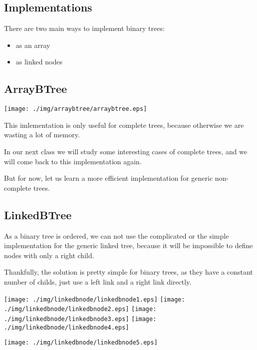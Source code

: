 \documentclass[a4paper, 9pt]{extarticle}
\begin{document}
\newpage



\subsection{Implementations}

There are two main ways to implement binary trees:

\begin{itemize}

  \item as an array

  \item as linked nodes

\end{itemize}

\subsection{ArrayBTree}

\begin{center}
  \texttt{[image: ./img/arraybtree/arraybtree.eps]}
\end{center}

This imlementation is only useful for complete trees,
because otherwise we are wasting a lot of memory.

In our next class we will study some interesting cases of complete trees,
and we will come back to this implementation again.

But for now, let us learn a more efficient implementation for generic
non-complete trees.


\subsection{LinkedBTree}

As a binary tree is ordered, we can not use the complicated or the simple
implementation for the generic linked tree, because it will be impossible to
define nodes with only a right child.

Thankfully, the solution is pretty simple for binary trees, as they have a
constant number of childs, just use a left link and a right link directly.

\texttt{[image: ./img/linkedbnode/linkedbnode1.eps]}
\texttt{[image: ./img/linkedbnode/linkedbnode2.eps]}
\texttt{[image: ./img/linkedbnode/linkedbnode3.eps]}
\texttt{[image: ./img/linkedbnode/linkedbnode4.eps]}
\begin{center}
  \texttt{[image: ./img/linkedbnode/linkedbnode5.eps]}
\end{center}
\end{document}
